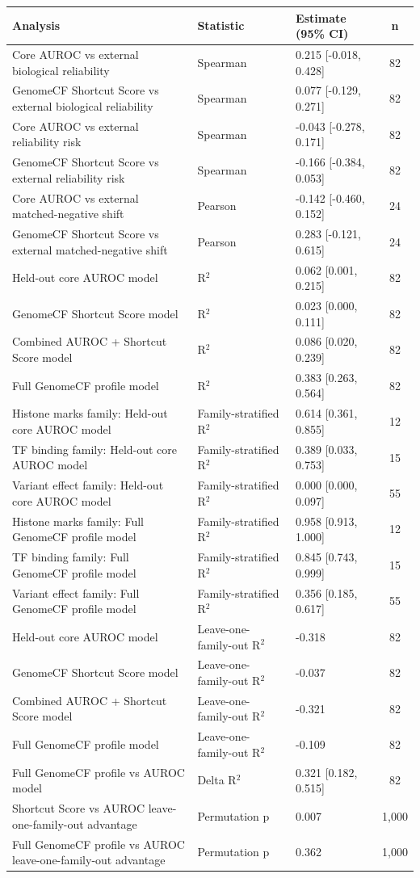 \begin{tabular}{p{6.1cm}p{1.2cm}p{3.6cm}c}
\toprule
Analysis & Statistic & Estimate (95\% CI) & n \\
\midrule
Core AUROC vs external biological reliability & Spearman & 0.215 [-0.018, 0.428] & 82 \\
GenomeCF Shortcut Score vs external biological reliability & Spearman & 0.077 [-0.129, 0.271] & 82 \\
Core AUROC vs external reliability risk & Spearman & -0.043 [-0.278, 0.171] & 82 \\
GenomeCF Shortcut Score vs external reliability risk & Spearman & -0.166 [-0.384, 0.053] & 82 \\
Core AUROC vs external matched-negative shift & Pearson & -0.142 [-0.460, 0.152] & 24 \\
GenomeCF Shortcut Score vs external matched-negative shift & Pearson & 0.283 [-0.121, 0.615] & 24 \\
Held-out core AUROC model & R$^2$ & 0.062 [0.001, 0.215] & 82 \\
GenomeCF Shortcut Score model & R$^2$ & 0.023 [0.000, 0.111] & 82 \\
Combined AUROC + Shortcut Score model & R$^2$ & 0.086 [0.020, 0.239] & 82 \\
Full GenomeCF profile model & R$^2$ & 0.383 [0.263, 0.564] & 82 \\
Histone marks family: Held-out core AUROC model & Family-stratified R$^2$ & 0.614 [0.361, 0.855] & 12 \\
TF binding family: Held-out core AUROC model & Family-stratified R$^2$ & 0.389 [0.033, 0.753] & 15 \\
Variant effect family: Held-out core AUROC model & Family-stratified R$^2$ & 0.000 [0.000, 0.097] & 55 \\
Histone marks family: Full GenomeCF profile model & Family-stratified R$^2$ & 0.958 [0.913, 1.000] & 12 \\
TF binding family: Full GenomeCF profile model & Family-stratified R$^2$ & 0.845 [0.743, 0.999] & 15 \\
Variant effect family: Full GenomeCF profile model & Family-stratified R$^2$ & 0.356 [0.185, 0.617] & 55 \\
Held-out core AUROC model & Leave-one-family-out R$^2$ & -0.318 & 82 \\
GenomeCF Shortcut Score model & Leave-one-family-out R$^2$ & -0.037 & 82 \\
Combined AUROC + Shortcut Score model & Leave-one-family-out R$^2$ & -0.321 & 82 \\
Full GenomeCF profile model & Leave-one-family-out R$^2$ & -0.109 & 82 \\
Full GenomeCF profile vs AUROC model & Delta R$^2$ & 0.321 [0.182, 0.515] & 82 \\
Shortcut Score vs AUROC leave-one-family-out advantage & Permutation p & 0.007 & 1,000 \\
Full GenomeCF profile vs AUROC leave-one-family-out advantage & Permutation p & 0.362 & 1,000 \\
\bottomrule
\end{tabular}
